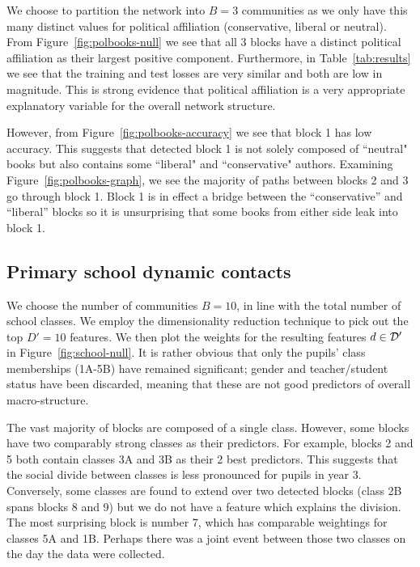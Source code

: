 We choose to partition the network into $B=3$ communities as we only have this many distinct values for political affiliation (conservative, liberal or neutral).
From Figure~\ref{fig:polbooks-null} we see that all 3 blocks have a distinct political affiliation as their largest positive component.  
Furthermore, in Table~\ref{tab:results} we see that the training and test losses 
are very similar and both are low in magnitude. This is strong evidence 
that political affiliation is a very appropriate explanatory 
variable for the overall network structure.

However, from Figure~\ref{fig:polbooks-accuracy} we see that block 1 has low accuracy. 
This suggests that detected block 1 is not solely composed of ``neutral" books but also 
contains some ``liberal" and ``conservative" authors. Examining 
Figure~\ref{fig:polbooks-graph}, we see the majority of paths between blocks 2 and 3 go through block 1.
Block 1 is in effect a bridge between the ``conservative'' and ``liberal'' blocks so it is unsurprising that some books from either side leak into block 1.

\subsection{Primary school dynamic contacts}

We choose the number of communities $B=10$, in line with the total number of 
school classes. We 
employ the dimensionality reduction technique to pick out the top $D'=10$ features. 
We then plot the weights for the resulting features $d \in \mathcal{D}'$ 
in Figure~\ref{fig:school-null}. It is rather obvious
that only the pupils' class memberships (1A-5B) have remained
significant;
gender and teacher/student status have been discarded,
meaning that these are not good predictors of overall macro-structure.

The vast majority of blocks are composed of a single class. 
However, some blocks have two comparably strong classes as their predictors. 
For example, blocks 2 and 5 both contain classes 3A and 3B as their 2 best predictors. 
This suggests that the social divide between classes is less pronounced 
for pupils in year 3. Conversely, some classes are found to extend over two 
detected blocks (class 2B spans blocks 8 and 9) but we do 
not have a feature which explains the division. The most surprising block 
is number 7, which has comparable weightings for classes 5A and 1B. 
Perhaps there was a joint event between those two classes on the day 
the data were collected.

